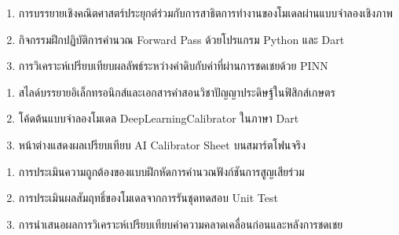 \begin{tcolorbox}[
    enhanced, breakable,
    colback=white, colframe=rbruNavy,
    fonttitle=\bfseries\color{white},
    title={3. วิธีสอนและกิจกรรมการเรียนการสอน},
    arc=1.5mm, boxrule=0.8pt, leftrule=3.5mm
]
\begin{enumerate}
    \item การบรรยายเชิงคณิตศาสตร์ประยุกต์ร่วมกับการสาธิตการทำงานของโมเดลผ่านแบบจำลองเชิงภาพ
    \item กิจกรรมฝึกปฏิบัติการคำนวณ Forward Pass ด้วยโปรแกรม Python และ Dart
    \item การวิเคราะห์เปรียบเทียบผลลัพธ์ระหว่างค่าดิบกับค่าที่ผ่านการชดเชยด้วย PINN
\end{enumerate}
\end{tcolorbox}

\begin{tcolorbox}[
    enhanced, breakable,
    colback=white, colframe=rbruNavy,
    fonttitle=\bfseries\color{white},
    title={4. สื่อการเรียนการสอน},
    arc=1.5mm, boxrule=0.8pt, leftrule=3.5mm
]
\begin{enumerate}
    \item สไลด์บรรยายอิเล็กทรอนิกส์และเอกสารคำสอนวิชาปัญญาประดิษฐ์ในฟิสิกส์เกษตร
    \item โค้ดต้นแบบจำลองโมเดล DeepLearningCalibrator ในภาษา Dart
    \item หน้าต่างแสดงผลเปรียบเทียบ AI Calibrator Sheet บนสมาร์ตโฟนจริง
\end{enumerate}
\end{tcolorbox}

\begin{tcolorbox}[
    enhanced, breakable,
    colback=white, colframe=rbruNavy,
    fonttitle=\bfseries\color{white},
    title={5. การวัดและประเมินผล},
    arc=1.5mm, boxrule=0.8pt, leftrule=3.5mm
]
\begin{enumerate}
    \item การประเมินความถูกต้องของแบบฝึกหัดการคำนวณฟังก์ชันการสูญเสียร่วม
    \item การประเมินผลสัมฤทธิ์ของโมเดลจากการรันชุดทดสอบ Unit Test
    \item การนำเสนอผลการวิเคราะห์เปรียบเทียบค่าความคลาดเคลื่อนก่อนและหลังการชดเชย
\end{enumerate}
\end{tcolorbox}

\clearpage

